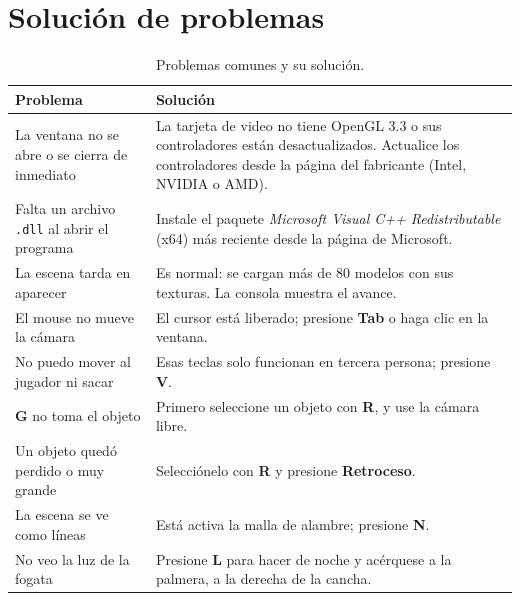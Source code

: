 \documentclass[12pt,letterpaper]{article}
\newcommand{\tecla}[1]{\textbf{#1}}
\begin{document}
\section{Solución de problemas}
\begin{table}[H]
  \centering
  \caption{Problemas comunes y su solución.}
  \renewcommand{\arraystretch}{1.25}
  \begin{tabularx}{\linewidth}{>{\raggedright\arraybackslash}p{5cm} X}
    \toprule
    \textbf{Problema} & \textbf{Solución} \\
    \midrule
    La ventana no se abre o se cierra de inmediato &
      La tarjeta de video no tiene OpenGL 3.3 o sus controladores están desactualizados.
      Actualice los controladores desde la página del fabricante (Intel, NVIDIA o AMD). \\
    Falta un archivo \texttt{.dll} al abrir el programa &
      Instale el paquete \emph{Microsoft Visual C++ Redistributable} (x64) más reciente
      desde la página de Microsoft. \\
    La escena tarda en aparecer &
      Es normal: se cargan más de 80 modelos con sus texturas. La consola muestra el
      avance. \\
    El mouse no mueve la cámara &
      El cursor está liberado; presione \tecla{Tab} o haga clic en la ventana. \\
    No puedo mover al jugador ni sacar &
      Esas teclas solo funcionan en tercera persona; presione \tecla{V}. \\
    \tecla{G} no toma el objeto &
      Primero seleccione un objeto con \tecla{R}, y use la cámara libre. \\
    Un objeto quedó perdido o muy grande &
      Selecciónelo con \tecla{R} y presione \tecla{Retroceso}. \\
    La escena se ve como líneas &
      Está activa la malla de alambre; presione \tecla{N}. \\
    No veo la luz de la fogata &
      Presione \tecla{L} para hacer de noche y acérquese a la palmera, a la derecha de la
      cancha. \\
    \bottomrule
  \end{tabularx}
\end{table}

\end{document}

